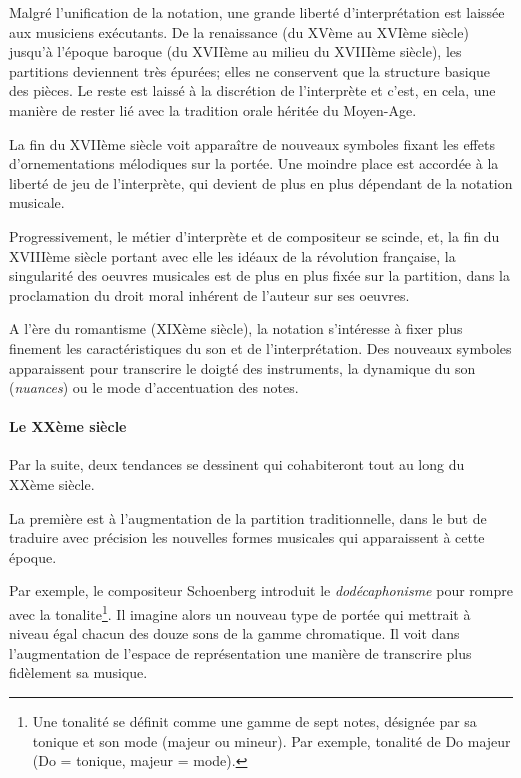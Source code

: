 Malgré l'unification de la notation, une grande liberté d'interprétation est laissée aux musiciens exécutants. De la renaissance (du XVème au XVIème siècle) jusqu'à l'époque baroque (du XVIIème au milieu du XVIIIème siècle), les partitions deviennent très épurées; elles ne conservent que la structure basique des pièces. Le reste est laissé à la discrétion de l'interprète et c'est, en cela, une manière de rester lié avec la tradition orale héritée du Moyen-Age.


La fin du XVIIème siècle voit apparaître de nouveaux symboles fixant les effets d'ornementations mélodiques sur la portée. Une moindre place est accordée à la liberté de jeu de l'interprète, qui devient de plus en plus dépendant de la notation musicale.

Progressivement, le métier d'interprète et de compositeur se scinde, et, la fin du XVIIIème siècle portant avec elle les idéaux de la révolution française, la singularité des oeuvres musicales est de plus en plus fixée sur la partition, dans la proclamation du droit moral inhérent de l'auteur sur ses oeuvres.

A l'ère du romantisme (XIXème siècle), la notation s'intéresse à fixer plus finement les caractéristiques du son et de l'interprétation. Des nouveaux symboles apparaissent pour transcrire le doigté des instruments, la dynamique du son (\textit{nuances}) ou le mode d'accentuation des notes.


\paragraph{Le XXème siècle} Par la suite, deux tendances se dessinent qui cohabiteront tout au long du XXème siècle. 

La première est à l'augmentation de la partition traditionnelle, dans le but de traduire avec précision les nouvelles formes musicales qui apparaissent à cette époque.

Par exemple, le compositeur Schoenberg introduit le \textit{dodécaphonisme} pour rompre avec la \gls{tonalite}\footnote{Une tonalité se définit comme une gamme de sept notes, désignée par sa tonique et son mode (majeur ou mineur). Par exemple, tonalité de Do majeur (Do = tonique, majeur = mode).}. Il imagine alors un nouveau type de portée qui mettrait à niveau égal chacun des douze sons de la gamme chromatique. Il voit dans l'augmentation de l'espace de représentation une manière de transcrire plus fidèlement sa musique.


